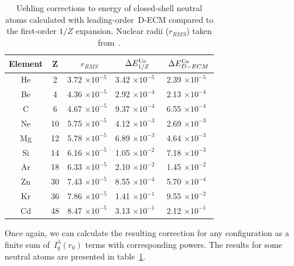 \begin{table}[]
    \centering
    \begin{tabular}{ccc|cc}
	Element & Z &~$r_{RMS}$ &~$\Delta E^{\rm{Ue}}_{1/Z}$ &~$\Delta E^{\rm{Ue}}_{D-ECM}$ \\
	\hline 
	\hline
	He & 2 & 3.72 $\times 10^{-5}$ & 3.42 $\times 10^{-5}$ & 2.39 $\times 10^{-5}$ \\
	Be & 4 & 4.36 $\times 10^{-5}$ & 2.92 $\times 10^{-4}$ & 2.13 $\times 10^{-4}$ \\
	C & 6 & 4.67 $\times 10^{-5}$ & 9.37 $\times 10^{-4}$ & 6.55 $\times 10^{-4}$ \\
	Ne & 10 & 5.75 $\times 10^{-5}$ & 4.12 $\times 10^{-3}$ & 2.69 $\times 10^{-3}$ \\
	Mg & 12 & 5.78 $\times 10^{-5}$ &  6.89 $\times 10^{-3}$ & 4.64 $\times 10^{-3}$ \\
	Si & 14 & 6.16 $\times 10^{-5}$ &  1.05 $\times 10^{-2}$ & 7.18 $\times 10^{-3}$  \\
	Ar & 18 & 6.33 $\times 10^{-5}$ & 2.10 $\times 10^{-2}$ & 1.45 $\times 10^{-2}$ \\
	Zn & 30 & 7.43 $\times 10^{-5}$ & 8.55 $\times 10^{-4}$ & 5.70 $\times 10^{-4}$ \\
	Kr & 36 & 7.86 $\times 10^{-5}$ & 1.41 $\times 10^{-1}$ & 9.55 $\times 10^{-2}$ \\
	Cd & 48 & 8.47 $\times 10^{-5}$ & 3.13 $\times 10^{-1}$ & 2.12 $\times 10^{-1}$ \\
	\hline
    \end{tabular}
	\caption{Uehling corrections to energy of closed-shell neutral atoms calculated with leading-order~D-ECM compared to the first-order $1/Z$ expansion. Nuclear radii ($r_{RMS}$) taken from~\cite{ANGELI201369}.}
	\label{tab:Uehling}
\end{table}

Once again, we can calculate the resulting correction for any configuration as a finite sum of~$I_q^\lambda (r_0)$ terms with corresponding powers. %
The results for some neutral atoms are presented in table~\ref{tab:Uehling}.

